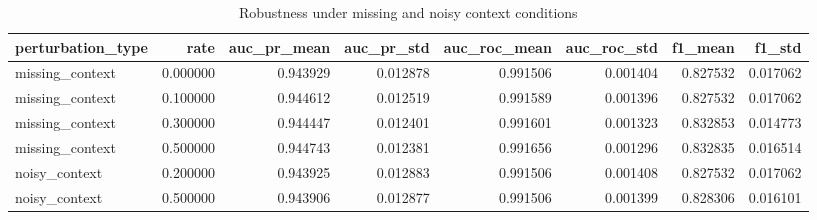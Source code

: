 \begin{table}[t]
\centering
\caption{Robustness under missing and noisy context conditions}
\label{tab:robustness}
\small
\begin{tabular}{lrrrrrrr}
\toprule
perturbation_type & rate & auc_pr_mean & auc_pr_std & auc_roc_mean & auc_roc_std & f1_mean & f1_std \\
\midrule
missing_context & 0.000000 & 0.943929 & 0.012878 & 0.991506 & 0.001404 & 0.827532 & 0.017062 \\
missing_context & 0.100000 & 0.944612 & 0.012519 & 0.991589 & 0.001396 & 0.827532 & 0.017062 \\
missing_context & 0.300000 & 0.944447 & 0.012401 & 0.991601 & 0.001323 & 0.832853 & 0.014773 \\
missing_context & 0.500000 & 0.944743 & 0.012381 & 0.991656 & 0.001296 & 0.832835 & 0.016514 \\
noisy_context & 0.200000 & 0.943925 & 0.012883 & 0.991506 & 0.001408 & 0.827532 & 0.017062 \\
noisy_context & 0.500000 & 0.943906 & 0.012877 & 0.991506 & 0.001399 & 0.828306 & 0.016101 \\
\bottomrule
\end{tabular}
\end{table}
